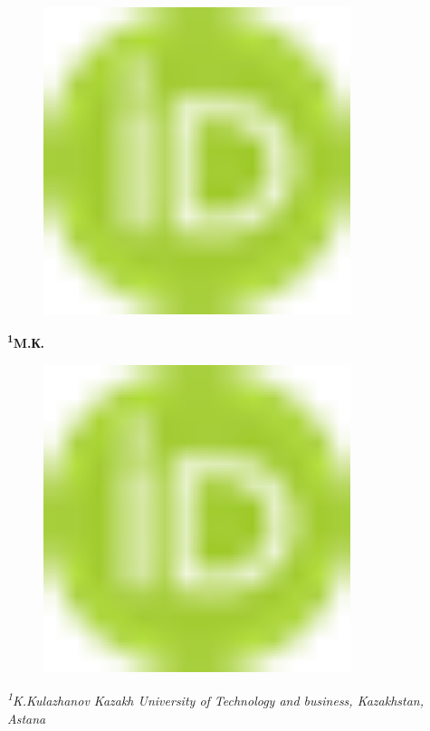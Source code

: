 {\begin{figure}[H]
	\centering
	\includegraphics[width=0.8\textwidth]{media/ekon2/image1}
	\caption*{}
\end{figure}


{\bfseries \textsuperscript{1}M.К.
\begin{figure}[H]
	\centering
	\includegraphics[width=0.8\textwidth]{media/ekon2/image1}
	\caption*{}
\end{figure}


\emph{\textsuperscript{1}K.Kulazhanov Kazakh University of Technology
and business, Kazakhstan, Astana}

}}
